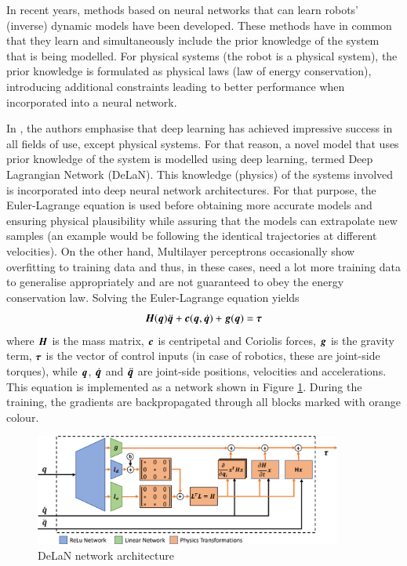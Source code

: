 In recent years, methods based on neural networks that can learn robots' (inverse) dynamic models have been developed. These methods have in common that they learn and simultaneously include the prior knowledge of the system that is being modelled. For physical systems (the robot is a physical system), the prior knowledge is formulated as physical laws (law of energy conservation), introducing additional constraints leading to better performance when incorporated into a neural network.

In \cite{Lutter2019, Lutter2019a}, the authors emphasise that deep learning has achieved impressive success in all fields of use, except physical systems. For that reason, a novel model that uses prior knowledge of the system is modelled using deep learning, termed Deep Lagrangian Network (DeLaN). This knowledge (physics) of the systems involved is incorporated into deep neural network architectures. For that purpose, the Euler-Lagrange equation is used before obtaining more accurate models and ensuring physical plausibility while assuring that the models can extrapolate new samples (an example would be following the identical trajectories at different velocities). On the other hand, Multilayer perceptrons occasionally show overfitting to training data and thus, in these cases, need a lot more training data to generalise appropriately and are not guaranteed to obey the energy conservation law. Solving the Euler-Lagrange equation yields
\[
    {\bm{H}}({\bm{q}})\ddot{{\bm{q}}} + {\bm{c}}({\bm{q}},\dot{{\bm{q}}}) + {\bm{g}}({\bm{q}}) = {\bm{\tau}}
\]
where ${\bm{H}}$ is the mass matrix, ${\bm{c}}$ is centripetal and Coriolis forces, ${\bm{g}}$ is the gravity term, ${\bm{\tau}}$ is the vector of control inputs (in case of robotics, these are joint-side torques), while ${\bm{q}}$, $\dot{{\bm{q}}}$ and $\ddot{{\bm{q}}}$ are joint-side positions, velocities and accelerations. This equation is implemented as a network shown in Figure \ref{fig:DeLaN}. During the training, the gradients are backpropagated through all blocks marked with orange colour.

\begin{figure}
    \centering
    \includegraphics[width=0.9\textwidth]{slike/Fig02_07.png}
    \caption[DeLaN network architecture]{DeLaN network architecture \cite{Lutter2019}}
    \label{fig:DeLaN}
\end{figure}

